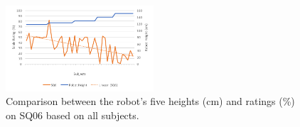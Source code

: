 %
\begin{figure}[H]
	\centering
	\includegraphics[width = 0.49\textwidth]{Figure/HeightSQ6}
	\setlength{} 
	\caption{Comparison between the robot's five heights (cm) and ratings (\%) on SQ06 based on all subjects.}
	\label{fig:HeightSQ6}
\end{figure}
\noindent
%
